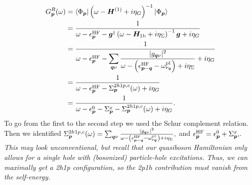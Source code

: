 \begin{align}
    G_{\bm p}^{R}(\omega)
    &=
    \langle\Phi_{\bm p}|
    \left(
    \omega-\bm H^{(1)}+i\eta_G
    \right)^{-1}
    |\Phi_{\bm p}\rangle \\
    &=
    \frac{1}{
    \omega-\epsilon_{\bm p}^{\rm HF}
    -
    \bm g^{\dagger}
    \left(
    \omega-\bm H_{1{\rm b}}+i\eta_{\Sigma}
    \right)^{-1}
    \bm g
    +i\eta_G
    }\\
    &=
    \frac{1}{
    \omega-\epsilon_{\bm p}^{\rm HF}
    -
    \displaystyle
    \sum_{\bm q\nu}
    \frac{|g_{\bm q\nu}|^2}{
    \omega-
    \left(
    \epsilon_{\bm p-\bm q}^{\rm HF}
    -
    \omega_{\nu_{\bm q}}^{\rm pl}
    \right)
    +i\eta_{\Sigma}}
    +i\eta_G
    }\\
    &=
    \frac{1}{
    \omega-\epsilon_{\bm p}^{\rm HF}
    -\Sigma_{\bm p}^{2h1p,c}(\omega)
    +i\eta_G}\\
    &=
    \frac{1}{
    \omega-\epsilon_{\bm p}^{0}
    -\Sigma_{\bm p}^{x}
    -\Sigma_{\bm p}^{2h1p,c}(\omega)
    +i\eta_G}.
\end{align}
To go from the first to the second step we used the Schur complement relation. Then we identified $
    \Sigma_{\bm p}^{2h1p,c}(\omega)
    =
    \sum_{\bm q\nu}
    \frac{|g_{\bm q\nu}|^2}{
    \omega-
    \left(
    \epsilon_{\bm p-\bm q}^{\rm HF}
    -
    \omega_{\nu_{\bm q}}^{\rm pl}
    \right)
    +i\eta_{\Sigma}},
$
and
$
    \epsilon_{\bm p}^{\rm HF}
    =
    \epsilon_{\bm p}^{0}
    +
    \Sigma_{\bm p}^{x},
$.
\emph{This may look unconventional, but recall that our quasiboson Hamiltonian only allows for a single hole with (bosonized) particle-hole excitations. Thus, we can maximally get a 2h1p configuration, so the 2p1h contribution must vanish from the self-energy.}
